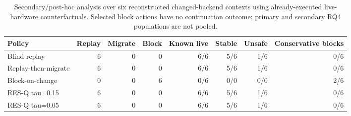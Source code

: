 \begin{table}[t]
\centering
\small
\caption{Secondary/post-hoc analysis over six reconstructed changed-backend contexts using already-executed live-hardware counterfactuals. Selected block actions have no continuation outcome; primary and secondary RQ4 populations are not pooled.}
\label{tab:hardware-rq4-secondary}
\begin{tabular}{@{}lrrrrrrr@{}}
\toprule
\textbf{Policy} & \textbf{Replay} & \textbf{Migrate} & \textbf{Block} & \textbf{Known live} & \textbf{Stable} & \textbf{Unsafe} & \textbf{Conservative blocks} \\
\midrule
Blind replay & 6 & 0 & 0 & 6/6 & 5/6 & 1/6 & 0/6 \\
Replay-then-migrate & 6 & 0 & 0 & 6/6 & 5/6 & 1/6 & 0/6 \\
Block-on-change & 0 & 0 & 6 & 0/6 & 0/0 & 0/0 & 2/6 \\
RES-Q tau=0.15 & 6 & 0 & 0 & 6/6 & 5/6 & 1/6 & 0/6 \\
RES-Q tau=0.05 & 6 & 0 & 0 & 6/6 & 5/6 & 1/6 & 0/6 \\
\bottomrule
\end{tabular}
\end{table}

